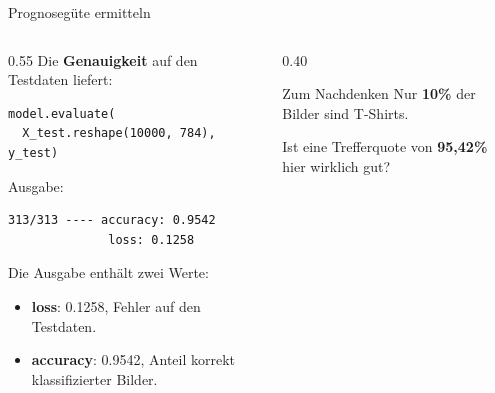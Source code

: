   \begin{frame}[fragile]{Prognosegüte ermitteln}
\begin{columns}
\begin{column}{0.55\textwidth}
Die \textbf{Genauigkeit} auf den Testdaten liefert:
\begin{verbatim}
model.evaluate(
  X_test.reshape(10000, 784), y_test)
\end{verbatim}

\vspace{0.3em}
Ausgabe:
\begin{verbatim}
313/313 ---- accuracy: 0.9542
              loss: 0.1258
\end{verbatim}

\vspace{0.3em}
Die Ausgabe enthält zwei Werte:
\begin{itemize}
\item \textbf{loss}: 0.1258, Fehler auf den Testdaten.
\item \textbf{accuracy}: 0.9542, Anteil korrekt klassifizierter Bilder.
\end{itemize}
\end{column}
\begin{column}{0.40\textwidth}
\centering
{}

\vspace{0.5em}
\begin{block}{Zum Nachdenken}
Nur \textbf{10\%} der Bilder sind T-Shirts.

\vspace{0.3em}
Ist eine Trefferquote von \textbf{95{,}42\%} hier wirklich gut?
\end{block}
\end{column}
\end{columns}
\end{frame}

